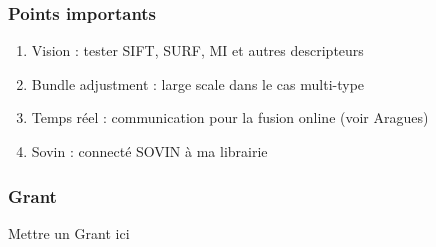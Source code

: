 \subsubsection{Points importants}
\begin{enumerate}
\item Vision : tester SIFT, SURF, MI et autres descripteurs
\item Bundle adjustment : large scale dans le cas multi-type
\item Temps réel : communication pour la fusion online (voir Aragues)
\item Sovin : connecté SOVIN à ma librairie
\end{enumerate}

\subsubsection{Grant}

Mettre un Grant ici \dag